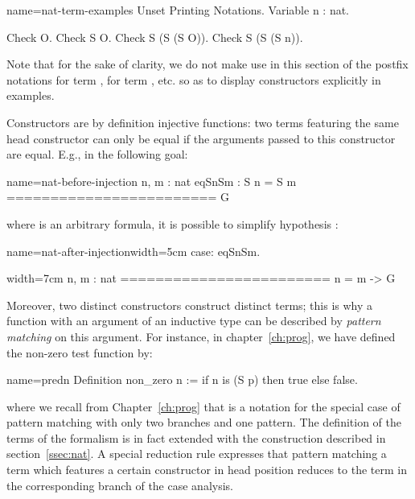 \begin{coq}{name=nat-term-examples}{}
Unset Printing Notations.
Variable n : nat.

Check O.
Check S O.
Check S (S (S O)).
Check S (S (S n)).

\end{coq}

Note that for the sake of clarity, we do not make use in this section
of the postfix  notations  for term ,  for
term , etc. so as to display constructors 
explicitly in examples.

Constructors are by definition injective functions: two terms
featuring the same head constructor can only be equal if the arguments
passed to this constructor are equal. E.g., in the following goal:

\begin{coqout}{name=nat-before-injection}{}
n, m : nat
eqSnSm : S n = S m
========================
G
\end{coqout}

where  is an arbitrary formula, it is possible to simplify
hypothesis :

\begin{coq-left}{name=nat-after-injection}{width=5cm}
case: eqSnSm.
$~$
$~$
$~$
$~$
\end{coq-left}
\begin{coqout-right}{}{width=7cm}
n, m : nat
========================
n = m -> G
\end{coqout-right}

Moreover, two distinct constructors construct distinct
terms; this is why a function with an argument of an inductive type can be
described by \emph{pattern matching} on this argument. For instance, in
chapter~\ref{ch:prog}, we have defined the non-zero test
function by:

\begin{coq}{name=predn}{}
Definition non_zero n := if n is (S p) then true else false.
\end{coq}
where we recall from Chapter~\ref{ch:prog} that  is a notation for the special case of pattern matching
with only two branches and one pattern. The definition of the terms of
the formalism is in fact extended with the 
construction described in section~\ref{ssec:nat}. A special reduction
rule expresses that pattern matching a term which features a certain
constructor in head position reduces to the term in the corresponding
branch of the case analysis.

